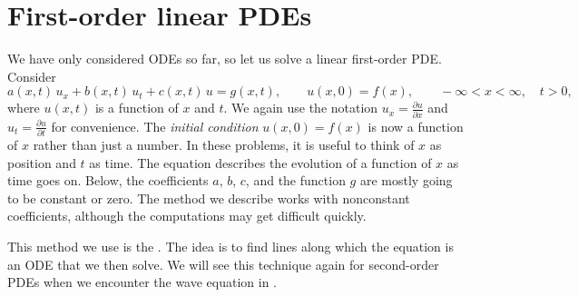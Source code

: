 \sectionnewpage
\section{First-order linear PDEs}
\label{fopde:section}


We have only considered ODEs so far, so let us solve a linear first-order
PDE\@.  Consider
\begin{equation*}
a(x,t) \, u_x + b(x,t) \, u_t + c(x,t) \, u = g(x,t), \qquad u(x,0) = f(x) , \qquad -\infty < x < \infty,
\quad t > 0 ,
\end{equation*}
where $u(x,t)$ is a function of $x$ and $t$.
We again use the notation $u_x = \frac{\partial u}{\partial x}$ and
$u_t = \frac{\partial u}{\partial t}$ for convenience.
The \emph{initial condition}
$u(x,0) = f(x)$ is now a function of $x$ rather than just a number.
In these problems, it is useful to think of $x$ as position and $t$ as time.
The equation describes the evolution of a function of $x$ as
time goes on.
Below, the coefficients $a$, $b$, $c$, and the function $g$
are mostly going to be constant or zero.  
The method we describe works with nonconstant coefficients,
although the computations may get difficult quickly.

This method we use is the
\emph{}.
The idea is to find lines along which the equation is
an ODE that we then solve.
We will see this technique again for second-order PDEs
when we encounter the wave equation in .

